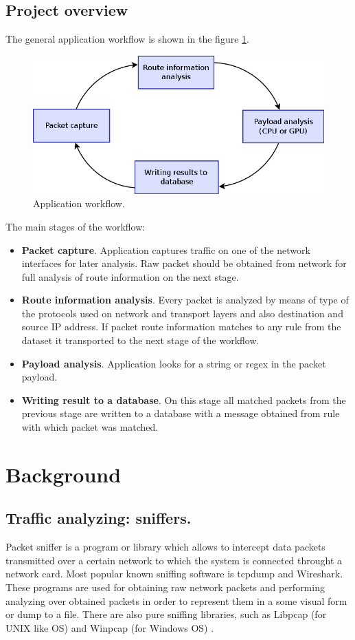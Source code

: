 \documentclass[thesis=M,english]{FITthesis}[2011/07/15]
\begin{document}
\section{Project overview}

The general application workflow is shown in the figure \ref{fig:app_workflow}.
\begin{figure}[h]
\centering
\includegraphics[scale=0.4]{images/workflow.png}
\caption{Application workflow.}
\label{fig:app_workflow}
\end{figure}

The main stages of the workflow:
\begin{itemize}
\item \textbf{Packet capture}. Application captures traffic on one of the network interfaces for later analysis. Raw packet should be obtained from network for full analysis of route information on the next stage.
\item \textbf{Route information analysis}. Every packet is analyzed by means of type of the protocols used on network and transport layers and also destination and source IP address. If packet route information matches to any rule from the dataset it transported to the next stage of the workflow.
\item \textbf{Payload analysis}. Application looks for a string or regex in the packet payload.
\item \textbf{Writing result to a database}. On this stage all matched packets from the previous stage are written to a database with a message obtained from rule with which packet was matched.
\end{itemize}

\chapter{Background}
\section{Traffic analyzing: sniffers.}
Packet sniffer is a program or library which allows to intercept data packets transmitted over a certain network to which the system is connected throught a network card. Most popular known sniffing software is tcpdump and Wireshark. These programs are used for obtaining raw network packets and performing analyzing over obtained packets in order to represent them in a some visual form or dump to a file. There are also pure sniffing libraries, such as Libpcap (for UNIX like OS) and Winpcap (for Windows OS) \cite{cap_app}.
\end{document}
